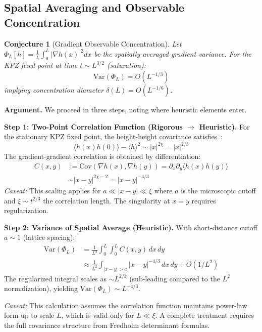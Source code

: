 \documentclass[aps,pre,reprint,amsmath,amssymb,superscriptaddress]{revtex4-2}
\newtheorem{conjecture}{Conjecture}
\begin{document}
\subsection{Spatial Averaging and Observable Concentration}

\begin{conjecture}[Gradient Observable Concentration]
\label{conj:gradient-conc}
Let $\Phi_L[h] = \frac{1}{L}\int_0^L |\nabla h(x)|^2 dx$ be the spatially-averaged gradient variance. For the KPZ fixed point at time $t \sim L^{3/2}$ (saturation):
\begin{equation}
\text{Var}(\Phi_L) = O(L^{-1/3})
\end{equation}
implying concentration diameter $\delta(L) = O(L^{-1/6})$.
\end{conjecture}

\textbf{Argument.} We proceed in three steps, noting where heuristic elements enter.

\textbf{Step 1: Two-Point Correlation Function (Rigorous $\to$ Heuristic).}
For the stationary KPZ fixed point, the height-height covariance satisfies~\cite{Prahofer2004}:
\begin{equation}
\langle h(x)h(0)\rangle - \langle h\rangle^2 \sim |x|^{2\chi} = |x|^{2/3}
\end{equation}
The gradient-gradient correlation is obtained by differentiation:
\begin{align}
C(x,y) &:= \text{Cov}(\nabla h(x), \nabla h(y)) = \partial_x \partial_y \langle h(x)h(y)\rangle \nonumber\\
&\sim |x-y|^{2\chi-2} = |x-y|^{-4/3}
\end{align}
\textit{Caveat:} This scaling applies for $a \ll |x-y| \ll \xi$ where $a$ is the microscopic cutoff and $\xi \sim t^{2/3}$ the correlation length. The singularity at $x=y$ requires regularization.

\textbf{Step 2: Variance of Spatial Average (Heuristic).}
With short-distance cutoff $a \sim 1$ (lattice spacing):
\begin{align}
\text{Var}(\Phi_L) &= \frac{1}{L^2} \int_0^L \int_0^L C(x,y) \, dx\, dy \nonumber\\
&\approx \frac{1}{L^2} \int_{|x-y|>a} |x-y|^{-4/3} \, dx\, dy + O(1/L^2)
\end{align}
The regularized integral scales as $\sim L^{2/3}$ (sub-leading compared to the $L^2$ normalization), yielding $\text{Var}(\Phi_L) \sim L^{-4/3}$.

\textit{Caveat:} This calculation assumes the correlation function maintains power-law form up to scale $L$, which is valid only for $L \ll \xi$. A complete treatment requires the full covariance structure from Fredholm determinant formulas.
\end{document}
